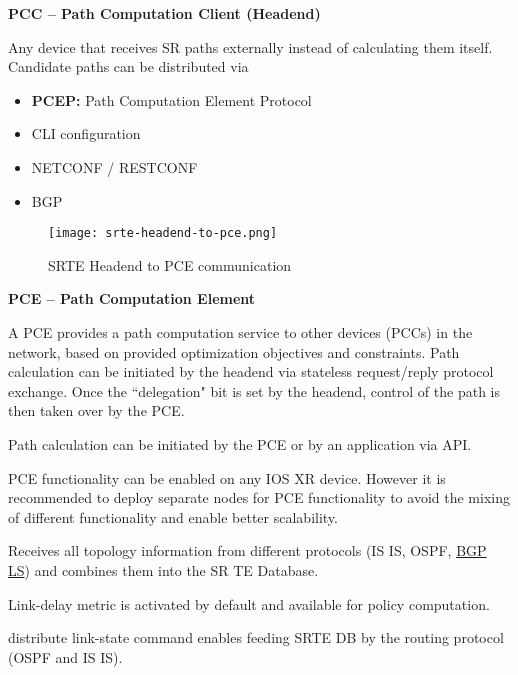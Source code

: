 \textbf{PCC -- Path Computation Client (Headend)}

Any device that receives SR paths externally instead of calculating them itself.
Candidate paths can be distributed via 
\begin{itemize}
    \item \textbf{PCEP:} Path Computation Element Protocol
    \item CLI configuration
    \item NETCONF / RESTCONF
    \item BGP 
\end{itemize}

\begin{figure}[h]
    \centering
    \texttt{[image: srte-headend-to-pce.png]}
    \caption{SRTE Headend to PCE communication}
\end{figure}

\textbf{PCE -- Path Computation Element}

\vspace{5mm}
\noindent
A PCE provides a path computation service to other devices (PCCs) in the network, based on provided optimization objectives and constraints.
Path calculation can be initiated by the headend via stateless request/reply protocol exchange.
Once the ``delegation" bit is set by the headend, control of the path is then taken over by the PCE.

Path calculation can be initiated by the PCE or by an application via API.

PCE functionality can be enabled on any IOS XR device. However it is recommended to deploy separate nodes for PCE 
functionality to avoid the mixing of different functionality and enable better scalability.

Receives all topology information from different protocols 
(IS IS, OSPF, \href{https://www.noction.com/blog/bgp-ls-link-state}{BGP LS}) and combines them into the SR TE Database.

Link-delay metric is activated by default and available for policy computation.

\ttfamily distribute link-state \rmfamily command enables feeding SRTE DB by the routing protocol (OSPF and IS IS).

